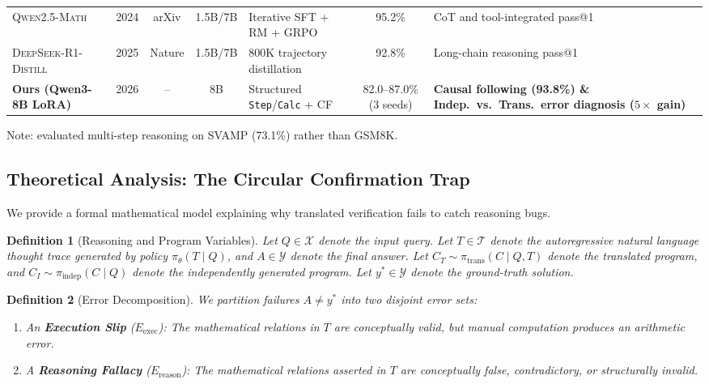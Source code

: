 \documentclass[11pt,a4paper]{article}
\newtheorem{definition}{Definition}
\begin{document}
\begin{table}[t]
\begin{tabularx}{\textwidth}{p{3.2cm} c c c X c p{4.6cm}}
\textsc{Qwen2.5-Math} \citep{yang2024qwen25math} & 2024 & arXiv & 1.5B/7B & Iterative SFT + RM + GRPO & 95.2\% & CoT and tool-integrated pass@1 \\
\textsc{DeepSeek-R1-Distill} \citep{deepseek2025r1} & 2025 & Nature & 1.5B/7B & 800K trajectory distillation & 92.8\% & Long-chain reasoning pass@1 \\
\midrule
\textbf{Ours (Qwen3-8B LoRA)} & 2026 & -- & 8B & Structured \texttt{Step}/\texttt{Calc} + CF & 82.0--87.0\% (3 seeds) & \textbf{Causal following (93.8\%) \& Indep.\ vs.\ Trans.\ error diagnosis ($5\times$ gain)} \\
\bottomrule
\end{tabularx}
\vspace{1mm}
\raggedright \scriptsize *Note: \citet{hsieh2023distilling} evaluated multi-step reasoning on SVAMP (73.1\%) rather than GSM8K.
\end{table}

\subsection{Theoretical Analysis: The Circular Confirmation Trap}
\label{subsec:circular_trap}
We provide a formal mathematical model explaining why translated verification fails to catch reasoning bugs.

\begin{definition}[Reasoning and Program Variables]
Let $Q \in \mathcal{X}$ denote the input query. Let $T \in \mathcal{T}$ denote the autoregressive natural language thought trace generated by policy $\pi_\theta(T \mid Q)$, and $A \in \mathcal{Y}$ denote the final answer. Let $C_T \sim \pi_{\text{trans}}(C \mid Q, T)$ denote the translated program, and $C_I \sim \pi_{\text{indep}}(C \mid Q)$ denote the independently generated program. Let $y^* \in \mathcal{Y}$ denote the ground-truth solution.
\end{definition}

\begin{definition}[Error Decomposition]
We partition failures $A \neq y^*$ into two disjoint error sets:
\begin{enumerate}
    \item An \textbf{Execution Slip} ($E_{\text{exec}}$): The mathematical relations in $T$ are conceptually valid, but manual computation produces an arithmetic error.
    \item A \textbf{Reasoning Fallacy} ($E_{\text{reason}}$): The mathematical relations asserted in $T$ are conceptually false, contradictory, or structurally invalid.
\end{enumerate}
\end{definition}
\end{document}
